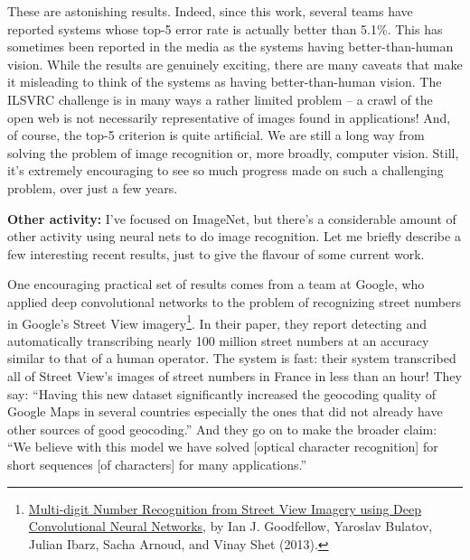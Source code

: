 \documentclass[a4paper,twoside,10pt]{book}
\begin{document}
These are astonishing results. Indeed, since this work, several teams have reported systems whose top-5 error rate is actually better than 5.1\%. This has sometimes been reported in the media as the systems having better-than-human vision. While the results are genuinely exciting, there are many caveats that make it misleading to think of the systems as having better-than-human vision. The ILSVRC challenge is in many ways a rather limited problem -- a crawl of the open web is not necessarily representative of images found in applications! And, of course, the top-5 criterion is quite artificial. We are still a long way from solving the problem of image recognition or, more broadly, computer vision. Still, it's extremely encouraging to see so much progress made on such a challenging problem, over just a few years.

\textbf{Other activity:} I've focused on ImageNet, but there's a considerable amount of other activity using neural nets to do image recognition. Let me briefly describe a few interesting recent results, just to give the flavour of some current work.

One encouraging practical set of results comes from a team at Google, who applied deep convolutional networks to the problem of recognizing street numbers in Google's Street View imagery\footnote{\href{http://arxiv.org/abs/1312.6082}{Multi-digit Number Recognition from Street View Imagery using Deep Convolutional Neural Networks}, by Ian J. Goodfellow, Yaroslav Bulatov, Julian Ibarz, Sacha Arnoud, and Vinay Shet (2013).}. In their paper, they report detecting and automatically transcribing nearly 100 million street numbers at an accuracy similar to that of a human operator. The system is fast: their system transcribed all of Street View's images of street numbers in France in less than an hour! They say: ``Having this new dataset significantly increased the geocoding quality of Google Maps in several countries especially the ones that did not already have other sources of good geocoding.'' And they go on to make the broader claim: ``We believe with this model we have solved [optical character recognition] for short sequences [of characters] for many applications.''
\end{document}
